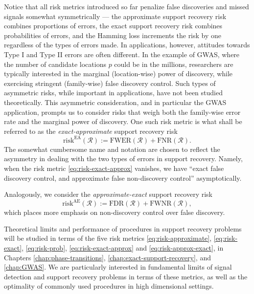 Notice that all risk metrics introduced so far penalize false discoveries and missed signals somewhat symmetrically --- the approximate support recovery risk combines proportions of errors, the exact support recovery risk combines probabilities of errors, and the Hamming loss increments the risk by one regardless of the types of errors made.
In applications, however, attitudes towards Type I and Type II errors are often different.
In the example of GWAS, where the number of candidate locations $p$ could be in the millions, researchers are typically interested in the marginal (location-wise) power of discovery, while exercising stringent (family-wise) false discovery control. 
Such types of asymmetric risks, while important in applications, have not been studied theoretically.  
This asymmetric consideration, and in particular the GWAS application, prompts us to consider risks that weigh both the family-wise error rate and the marginal power of discovery.
One such risk metric is what shall be referred to as the \emph{exact-approximate} support recovery risk
\begin{equation} \label{eq:risk-exact-approx}
    \mathrm{risk}^{\mathrm{EA}}(\mathcal{R}) := \mathrm{FWER}(\mathcal{R}) + \mathrm{FNR}(\mathcal{R}).
\end{equation}
The somewhat cumbersome name and notation are chosen to reflect
the asymmetry in dealing with the two types of errors in support recovery.
Namely, when the risk metric \eqref{eq:risk-exact-approx} vanishes, we have ``exact false discovery control, and approximate false non-discovery control'' asymptotically.

Analogously, we consider the \emph{approximate-exact} support recovery risk
\begin{equation} \label{eq:risk-approx-exact}
    \mathrm{risk}^{\mathrm{AE}}(\mathcal{R}) := \mathrm{FDR}(\mathcal{R}) + \mathrm{FWNR}(\mathcal{R}),
\end{equation}
which places more emphasis on non-discovery control over false discovery.

Theoretical limits and performance of procedures in support recovery problems will be studied in terms of the five risk metrics \eqref{eq:risk-approximate}, \eqref{eq:risk-exact}, \eqref{eq:risk-prob}, \eqref{eq:risk-exact-approx} and \eqref{eq:risk-approx-exact}, in Chapters \ref{chap:phase-transitions}, \ref{chap:exact-support-recovery}, and \ref{chap:GWAS}.
We are particularly interested in fundamental limits of signal detection and support recovery problems in terms of these metrics, as well as the optimality of commonly used procedures in high dimensional settings. 

